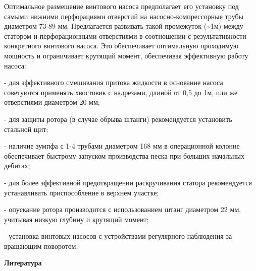 \begin{multicols}{2}
Оптимальное размещение винтового насоса предполагает его установку под
самыми нижними перфорациями отверстий на насосно-компрессорные трубы
диаметром 73-89 мм. Предлагается развивать такой промежуток
(\textasciitilde1м) между статором и перфорационными отверстиями в
соотношении с результативности конкретного винтового насоса. Это
обеспечивает оптимальную проходимую мощность и ограничивает крутящий
момент, обеспечивая эффективную работу насоса:

- для эффективного смешивания притока жидкости в основание насоса
советуются применять хвостовик с надрезами, длиной от 0,5 до 1м, или
же отверстиями диаметром 20 мм;

- для защиты ротора (в случае обрыва штанги) рекомендуется установить
стальной щит;

- наличие зумпфа с 1-4 трубами диаметром 168 мм в операционной колонне
обеспечивает быстрому запуском производства песка при больших
начальных дебитах;

- для более эффективной предотвращении раскручивания статора
рекомендуется устанавливать приспособление в верхнем участке;

- опускание ротора производится с использованием штанг диаметром 22 мм,
учитывая низкую глубину и крутящий момент;

- установка винтовых насосов с устройствами регулярного наблюдения за
вращающим поворотом.
\end{multicols}

\begin{center}
{\bfseries Литература}
\end{center}

